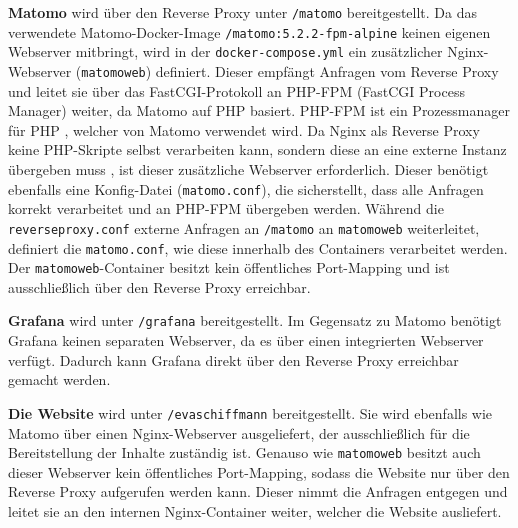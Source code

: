 \textbf{Matomo} wird über den Reverse Proxy unter \texttt{/matomo} bereitgestellt. Da das verwendete Matomo-Docker-Image \texttt{/matomo:5.2.2-fpm-alpine} keinen eigenen Webserver mitbringt, wird in der \texttt{docker-compose.yml} ein zusätzlicher Nginx-Webserver (\texttt{matomo\textunderscore web}) definiert. Dieser empfängt Anfragen vom Reverse Proxy und leitet sie über das FastCGI-Protokoll an PHP-FPM (FastCGI Process Manager) weiter, da Matomo auf PHP basiert. PHP-FPM ist ein Prozessmanager für PHP \parencite{PHPFPM}, welcher von Matomo verwendet wird. Da Nginx als Reverse Proxy keine PHP-Skripte selbst verarbeiten kann, sondern diese an eine externe Instanz übergeben muss \parencite{NginxReverseProxy}, ist dieser zusätzliche Webserver erforderlich. Dieser benötigt ebenfalls eine Konfig-Datei (\texttt{matomo.conf}), die sicherstellt, dass alle Anfragen korrekt verarbeitet und an PHP-FPM übergeben werden. Während die \texttt{reverse\textunderscore proxy.conf} externe Anfragen an \texttt{/matomo} an \texttt{matomo\textunderscore web} weiterleitet, definiert die \texttt{matomo.conf}, wie diese innerhalb des Containers verarbeitet werden. Der \texttt{matomo\textunderscore web}-Container besitzt kein öffentliches Port-Mapping und ist ausschließlich über den Reverse Proxy erreichbar.

\textbf{Grafana} wird unter \texttt{/grafana} bereitgestellt. Im Gegensatz zu Matomo benötigt Grafana keinen separaten Webserver, da es über einen integrierten Webserver verfügt. Dadurch kann Grafana direkt über den Reverse Proxy erreichbar gemacht werden.

\textbf{Die Website} wird unter \texttt{/evaschiffmann} bereitgestellt. Sie wird ebenfalls wie Matomo über einen Nginx-Webserver ausgeliefert, der ausschließlich für die Bereitstellung der Inhalte zuständig ist. Genauso wie \texttt{matomo\textunderscore web} besitzt auch dieser Webserver kein öffentliches Port-Mapping, sodass die Website nur über den Reverse Proxy aufgerufen werden kann. Dieser nimmt die Anfragen entgegen und leitet sie an den internen Nginx-Container weiter, welcher die Website ausliefert.

\begin{figure}[H]
    \centering
    \begin{minipage}{\textwidth}
        
    \end{minipage}
\end{figure}

